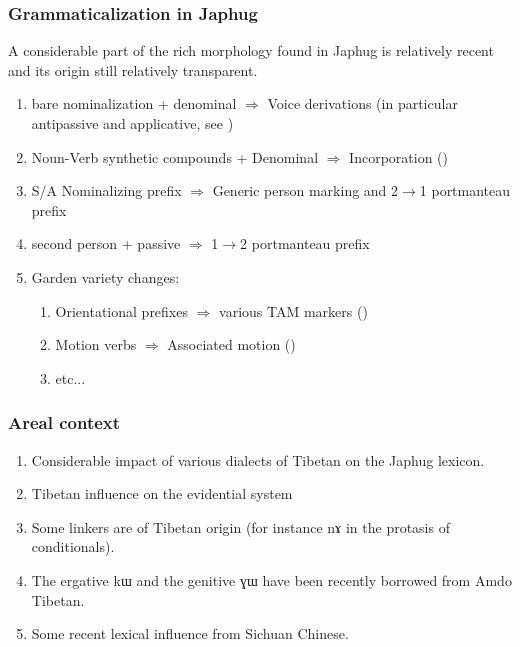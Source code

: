 \documentclass[xcolor=table]{beamer}
\newcommand{\ipa}[1]{{\phon \mbox{#1}}} %
\begin{document}
  \begin{frame} 
 \frametitle{Grammaticalization in Japhug} 

A considerable part of the rich morphology found in Japhug is relatively recent and its origin still relatively transparent.

 \begin{enumerate}[<+->]
 \item bare nominalization + denominal $\Rightarrow$  Voice derivations (in particular antipassive and applicative, see \citealt{jacques14antipassive})
 \item Noun-Verb synthetic compounds + Denominal $\Rightarrow$  Incorporation (\citealt{jacques12incorp})
   \item S/A Nominalizing prefix $\Rightarrow$  Generic person marking and 2$\rightarrow$1 portmanteau prefix
   \item second person + passive $\Rightarrow$ 1$\rightarrow$2 portmanteau prefix
	\item Garden variety changes:
 \begin{enumerate}	
 \item Orientational prefixes $\Rightarrow$  various TAM markers (\citealt{jackson07irrealis, lin11direction, jacques14linking})
 \item Motion verbs $\Rightarrow$ Associated motion (\citealt{jacques13harmonization})
  \item etc...
  \end{enumerate}
 \end{enumerate}

  \end{frame}   



  \begin{frame} 
 \frametitle{Areal context} 

 \begin{enumerate}[<+->]
 \item Considerable impact of various dialects of Tibetan on the Japhug lexicon.
 \item Tibetan influence on the evidential system
 \item Some linkers are of Tibetan origin (for instance \ipa{nɤ} in the protasis of conditionals).
 \item The ergative \ipa{kɯ} and the genitive \ipa{ɣɯ} have been recently borrowed from Amdo Tibetan.
 \item Some recent lexical influence from Sichuan Chinese.
 \end{enumerate}

  \end{frame}   
\end{document}
